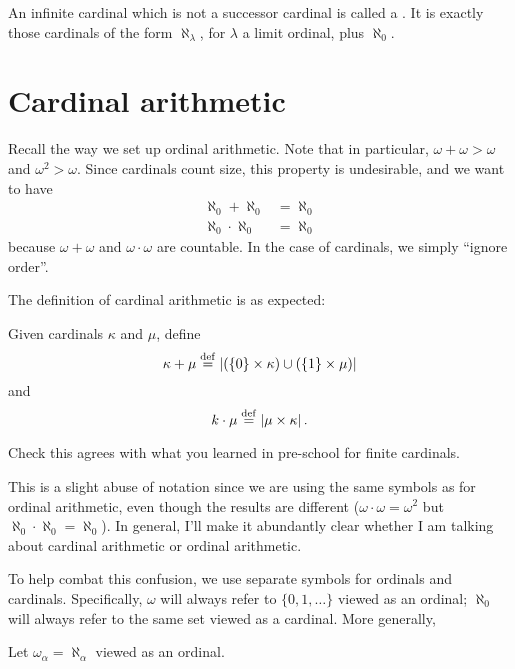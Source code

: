 \begin{definition}
	An infinite cardinal which is not a successor cardinal
	is called a .
	It is exactly those cardinals of the form $\aleph_\lambda$,
	for $\lambda$ a limit ordinal, plus $\aleph_0$.
\end{definition}


\section{Cardinal arithmetic}
Recall the way we set up ordinal arithmetic.
Note that in particular, $\omega + \omega > \omega$ and $\omega^2 > \omega$.
Since cardinals count size, this property is undesirable, and
we want to have
\begin{align*}
	\aleph_0 + \aleph_0 &= \aleph_0 \\
	\aleph_0 \cdot \aleph_0 &= \aleph_0
\end{align*}
because $\omega + \omega$ and $\omega \cdot \omega$ are countable.
In the case of cardinals, we simply ``ignore order''.

The definition of cardinal arithmetic is as expected:
\begin{definition}
	Given cardinals $\kappa$ and $\mu$, define
	\[ \kappa + \mu
		\overset{\mathrm{def}}{=}
		\left\lvert 
		\left( \left\{ 0 \right\} \times \kappa \right)
		\cup
		\left( \left\{ 1 \right\} \times \mu \right)
		\right\rvert
	\]
	and
	\[
		k \cdot \mu
		\overset{\mathrm{def}}{=}
		\left\lvert \mu \times \kappa \right\rvert
		.
	\]
\end{definition}


\begin{ques}
	Check this agrees with what you learned in pre-school
	for finite cardinals.
\end{ques}

\begin{abuse}
	This is a slight abuse of notation since we are using
	the same symbols as for ordinal arithmetic,
	even though the results are different ($\omega \cdot \omega = \omega^2$
	but $\aleph_0 \cdot \aleph_0 = \aleph_0$).
	In general, I'll make it abundantly clear whether I am talking
	about cardinal arithmetic or ordinal arithmetic.
\end{abuse}
To help combat this confusion, we use separate symbols for ordinals and cardinals.
Specifically, $\omega$ will always refer to $\{0,1,\dots\}$ viewed as an ordinal;
$\aleph_0$ will always refer to the same set viewed as a cardinal.
More generally,
\begin{definition}
	Let $\omega_\alpha = \aleph_\alpha$ viewed as an ordinal.
\end{definition}

